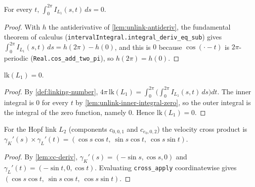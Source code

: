 \begin{lemma}
    \label{lem:unlink-inner-integral-zero}
    \leanok
    For every $t$, $\displaystyle\int_0^{2\pi} I_{L_1}(s,t)\,ds = 0$.
\end{lemma}
\begin{proof}
    With $h$ the antiderivative of \cref{lem:unlink-antideriv}, the fundamental
    theorem of calculus (\texttt{intervalIntegral.integral\_deriv\_eq\_sub}) gives
    $\int_0^{2\pi} I_{L_1}(s,t)\,ds = h(2\pi)-h(0)$, and this is $0$ because
    $\cos(\cdot-t)$ is $2\pi$-periodic (\texttt{Real.cos\_add\_two\_pi}), so
    $h(2\pi)=h(0)$.
\end{proof}

\begin{lemma}
    \label{lem:linking-unlink-zero}
    \leanok
    $\mathrm{lk}(L_1) = 0$.
\end{lemma}
\begin{proof}
    By \cref{def:linking-number},
    $4\pi\,\mathrm{lk}(L_1) = \int_0^{2\pi}\bigl(\int_0^{2\pi} I_{L_1}(s,t)\,ds\bigr)dt$.
    The inner integral is $0$ for every $t$ by
    \cref{lem:unlink-inner-integral-zero}, so the outer integral is the integral of
    the zero function, namely $0$. Hence $\mathrm{lk}(L_1) = 0$.
\end{proof}

\begin{lemma}
    \label{lem:hopf-crossproduct}
    For the Hopf link $L_2$ (components $c_{0,0,1}$ and $c_{e_0,0,2}$) the velocity
    cross product is
    $\gamma_K'(s)\times\gamma_L'(t)=(\cos s\cos t,\ \sin s\cos t,\ \cos s\sin t)$.
\end{lemma}
\begin{proof}
    By \cref{lem:cc-deriv}, $\gamma_K'(s)=(-\sin s,\cos s,0)$ and
    $\gamma_L'(t)=(-\sin t,0,\cos t)$. Evaluating \texttt{cross\_apply} coordinatewise
    gives $(\cos s\cos t,\ \sin s\cos t,\ \cos s\sin t)$.
\end{proof}

